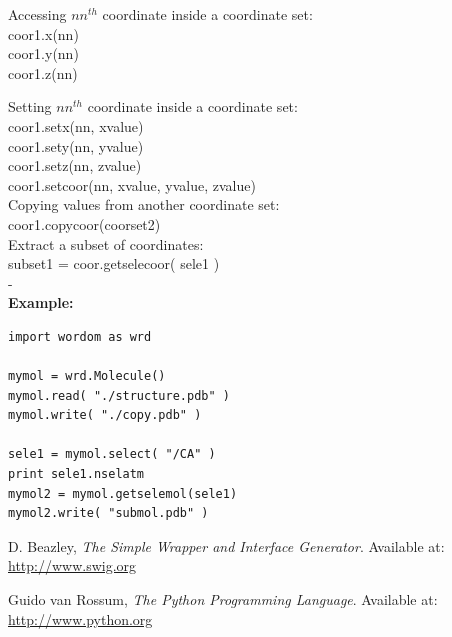 \documentclass[11pt,twoside,onecolumn,a4paper,openright,notitlepage]{book}[2001/04/21]
\begin{document}
Accessing $nn^{th}$ coordinate inside a coordinate set:\\
coor1.x(nn)\\
coor1.y(nn)\\
coor1.z(nn)

Setting $nn^{th}$ coordinate inside a coordinate set:\\
coor1.setx(nn, xvalue)\\
coor1.sety(nn, yvalue)\\
coor1.setz(nn, zvalue)\\
coor1.setcoor(nn, xvalue, yvalue, zvalue)\\

Copying values from another coordinate set:\\
coor1.copycoor(coorset2)\\

Extract a subset of coordinates:\\
subset1 = coor.getselecoor( sele1 )\\

-\\

{\bf Example:}
\begin{verbatim}
import wordom as wrd

mymol = wrd.Molecule()
mymol.read( "./structure.pdb" )
mymol.write( "./copy.pdb" )

sele1 = mymol.select( "/CA" )
print sele1.nselatm
mymol2 = mymol.getselemol(sele1)
mymol2.write( "submol.pdb" )

\end{verbatim}

\begin{thebibliography}{10}

D. Beazley, {\em The Simple Wrapper and Interface Generator}. Available at: \url{http://www.swig.org}

Guido van Rossum, {\em The Python Programming Language}. Available at: \url{http://www.python.org}

\end{thebibliography}

\clearpage

\end{document}
